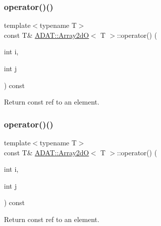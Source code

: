 \subsubsection{\texorpdfstring{operator()()}{operator()()}\hspace{0.1cm}{\footnotesize\ttfamily [5/6]}}
{\footnotesize\ttfamily template$<$typename T$>$ \\
const T\& \mbox{\hyperlink{classADAT_1_1Array2dO}{A\+D\+A\+T\+::\+Array2dO}}$<$ T $>$\+::operator() (\begin{DoxyParamCaption}\item[{int}]{i,  }\item[{int}]{j }\end{DoxyParamCaption}) const\hspace{0.3cm}{\ttfamily [inline]}}



Return const ref to an element. 

\mbox{\label{classADAT_1_1Array2dO_a3093245fdc65b66ac6d410d66feb2020}} 
\subsubsection{\texorpdfstring{operator()()}{operator()()}\hspace{0.1cm}{\footnotesize\ttfamily [6/6]}}
{\footnotesize\ttfamily template$<$typename T$>$ \\
const T\& \mbox{\hyperlink{classADAT_1_1Array2dO}{A\+D\+A\+T\+::\+Array2dO}}$<$ T $>$\+::operator() (\begin{DoxyParamCaption}\item[{int}]{i,  }\item[{int}]{j }\end{DoxyParamCaption}) const\hspace{0.3cm}{\ttfamily [inline]}}



Return const ref to an element. 

\mbox{\label{classADAT_1_1Array2dO_af8304f9edc7ab12b002b6a96f02a2111}} 

